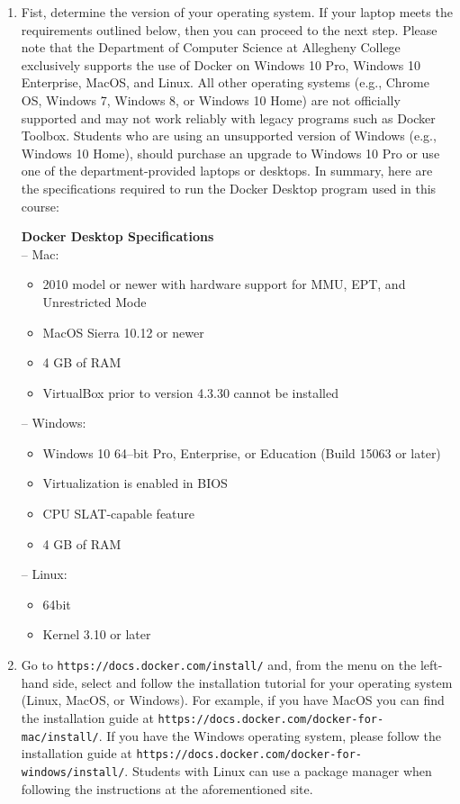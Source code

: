 \documentclass[11pt]{article}
\newcommand{\url}[1]{\lstinline{#1}}
\begin{document}
\begin{enumerate}

    \item Fist, determine the version of your operating system. If your laptop
      meets the requirements outlined below, then you can proceed to the next
      step. Please note that the Department of Computer Science at Allegheny
      College exclusively supports the use of Docker on Windows 10 Pro, Windows
      10 Enterprise, MacOS, and Linux. All other operating systems (e.g., Chrome
      OS, Windows 7, Windows 8, or Windows 10 Home) are not officially supported
      and may not work reliably with legacy programs such as Docker Toolbox.
      Students who are using an unsupported version of Windows (e.g., Windows 10
      Home), should purchase an upgrade to Windows 10 Pro or use one of the
      department-provided laptops or desktops. In summary, here are the
      specifications required to run the Docker Desktop program used in this
      course:

      \textbf{Docker Desktop Specifications} \\
      -- Mac:
      \begin{itemize}
        \item 2010 model or newer with hardware support for MMU, EPT, and Unrestricted Mode
        \item MacOS Sierra 10.12 or newer
        \item 4 GB of RAM
        \item VirtualBox prior to version 4.3.30 cannot be installed
      \end{itemize}
      -- Windows:
      \begin{itemize}
        \item Windows 10 64--bit Pro, Enterprise, or Education (Build 15063 or later)
        \item Virtualization is enabled in BIOS
        \item CPU SLAT-capable feature
        \item 4 GB of RAM
      \end{itemize}
      -- Linux:
      \begin{itemize}
        \item 64bit
        \item Kernel 3.10 or later
      \end{itemize}

    \item Go to \url{https://docs.docker.com/install/} and, from the menu on
      the left-hand side, select and follow the installation tutorial for your
      operating system (Linux, MacOS, or Windows). For example, if you have
      MacOS you can find the installation guide at
      \url{https://docs.docker.com/docker-for-mac/install/}. If you have the
      Windows operating system, please follow the installation guide at
      \url{https://docs.docker.com/docker-for-windows/install/}. Students with
      Linux can use a package manager when following the instructions at the
      aforementioned site.


\end{enumerate}
\end{document}
